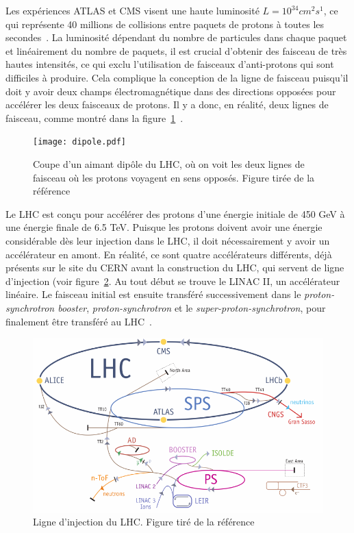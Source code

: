 Les expériences ATLAS et CMS visent une haute luminosité
$L = 10^{34} cm^2 s^1$, ce qui représente 40 millions de collisions
entre paquets de protons à toutes les
secondes~\cite{collaboration_atlas_2008}. La luminosité dépendant du
nombre de particules dans chaque paquet et linéairement du nombre de
paquets, il est crucial d'obtenir des faisceau de très hautes
intensités, ce qui exclu l'utilisation de faisceaux d'anti-protons
qui sont difficiles à produire. Cela complique la conception de la
ligne de faisceau puisqu'il doit y avoir deux champs électromagnétique
dans des directions opposées pour accélérer les deux faisceaux de
protons. Il y a donc, en réalité, deux lignes de faisceau, comme
montré dans la figure~\ref{fig:dipôle}~\cite{evans_lhc_2008}.

\begin{figure}
  \centering
  \texttt{[image: dipole.pdf]}
  \caption{Coupe d'un aimant dipôle du LHC, où on voit les deux lignes
    de faisceau où les protons voyagent en sens opposés. Figure tirée
    de la référence~\cite{evans_lhc_2008}}
\label{fig:dipôle}
\end{figure}

Le LHC est conçu pour accélérer des protons d'une énergie initiale de
450 GeV à une énergie finale de 6.5 TeV. Puisque les protons doivent
avoir une énergie considérable dès leur injection dans le LHC, il doit
nécessairement y avoir un accélérateur en amont. En réalité, ce sont
quatre accélérateurs différents, déjà présents sur le site du CERN
avant la construction du LHC, qui servent de ligne d'injection (voir
figure~\ref{fig:lhc_injection}. Au tout début se trouve le LINAC II,
un accélérateur linéaire. Le faisceau initial est ensuite transféré
successivement dans le \emph{proton-synchrotron booster},
\emph{proton-synchrotron} et le \emph{super-proton-synchrotron}, pour
finalement être transféré au LHC~\cite{evans_lhc_2008}.

\begin{figure}
  \centering
  \includegraphics{lhc_injection.pdf}
  \caption{Ligne d'injection du LHC. Figure tiré de la
    référence~\cite{Lefevre:1165534}}
  \label{fig:lhc_injection}
\end{figure}

